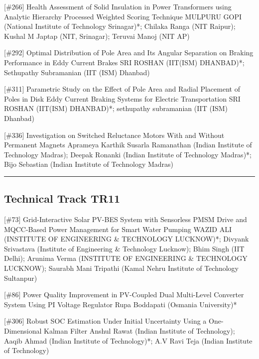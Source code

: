 {} \begin{abstract_online} {[\#266] Health Assessment of Solid Insulation in Power Transformers using Analytic Hierarchy Processed Weighted Scoring Technique} {} {MULPURU GOPI (National Institute of Technology Srinagar)*; Chilaka  Ranga (NIT Raipur); Kushal M  Japtap (NIT, Srinagar); Teruvai  Manoj (NIT AP)} {}  \end{abstract_online} 
{} \begin{abstract_online} {[\#292] Optimal Distribution of Pole Area and Its Angular Separation on Braking Performance in Eddy Current Brakes} {} {SRI ROSHAN (IIT(ISM) DHANBAD)*; Sethupathy Subramanian (IIT (ISM) Dhanbad)} {}  \end{abstract_online} 
{} \begin{abstract_online} {[\#311] Parametric Study on the Effect of Pole Area and Radial Placement of Poles in Disk Eddy Current Braking Systems for Electric Transportation} {} {SRI ROSHAN (IIT(ISM) DHANBAD)*; sethupathy subramanian (IIT (ISM) Dhanbad)} {}  \end{abstract_online} 
{} \begin{abstract_online} {[\#336] Investigation on Switched Reluctance Motors With and Without Permanent Magnets} {} {Aprameya Karthik Susarla Ramanathan (Indian Institute of Technology Madras); Deepak  Ronanki (Indian Institute of Technology Madras)*; Bijo Sebastian (Indian Institute of Technology Madras)} {}  \end{abstract_online} 
\hrule  \subsection{Technical Track TR11}\nopagebreak {} \begin{abstract_online} {[\#73] Grid-Interactive Solar PV-BES System with Sensorless PMSM Drive and MQCC-Based Power Management for Smart Water Pumping} {} {WAZID  ALI (INSTITUTE OF ENGINEERING \& TECHNOLOGY LUCKNOW)*; Divyank  Srivastava (Institute of Engineering \& Technology Lucknow); Bhim  Singh (IIT Delhi); Arunima  Verma (INSTITUTE OF ENGINEERING \& TECHNOLOGY LUCKNOW); Saurabh Mani Tripathi (Kamal Nehru Institute of Technology Sultanpur)} {}  \end{abstract_online} 
{} \begin{abstract_online} {[\#86] Power Quality Improvement in PV-Coupled Dual Multi-Level Converter System Using PI Voltage Regulator} {} {Rupa Boddapati (Osmania University)*} {}  \end{abstract_online} 
{} \begin{abstract_online} {[\#306] Robust SOC Estimation Under Initial Uncertainty Using a One-Dimensional Kalman Filter} {} {Anshul Rawat (Indian Institute of Technology); Aaqib Ahmad (Indian Institute of Technology)*; A.V Ravi Teja (Indian Institute of Technology)} {}  \end{abstract_online} 
